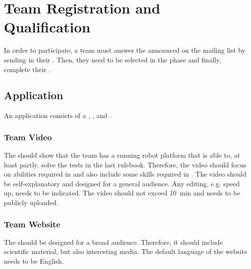 \section{Team Registration and Qualification}
\label{sec:rules:particpation}

In order to participate, a team must answer the \CFP{} announced on the \AtHome{} mailing list by sending in their \Application{}. Then, they need to be selected in the \Qualification{} phase and finally, complete their \Registration{}.

\subsection{Application}
\label{sec:rules:application}

An application consists of a \TeamVideo{}, \TeamWebsite{}, and \TDP{}.

\subsubsection{Team Video}
\label{sec:rules:application:video}
The \TeamVideo{} should show that the team has a running robot platform that is able to, at least partly, solve the tests in the last rulebook. Therefore, the video should focus on abilities required in \SONE{} and also include some skills required in \STWO{}. The video should be self-explanatory and designed for a general audience. Any editing, e.g. speed up, needs to be indicated. The video should not exceed \SI{10}{\minute} and needs to be publicly uploaded.


\subsubsection{Team Website}
\label{sec:rules:application:website}
The \TeamWebsite{} should be designed for a broad audience. Therefore, it should include scientific material, but also interesting media. The default language of the website needs to be English.


